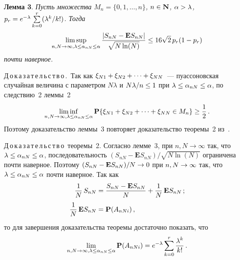 \begin{multicols}{2}
\medskip

\noindent
\textbf{Лемма 3}. \textit{Пусть множества $M_n=\{0, 1,\dots, n\}$,
$n\hm\in\mathbf{N}$, $\alpha \hm >\lambda $,
$p_r\hm=e^{-\lambda}\sum\limits_{k=0}^r({\lambda^k}/{k!}) $.  Тогда
$$
\limsup\limits_{n, N\to\infty,
\lambda\le\alpha_{nN}\le\alpha}\displaystyle\frac{\displaystyle |S_{nN}-
\mathbf{E}S_{nN}|\mathstrut}{\displaystyle \sqrt{N\ln(N)}\mathstrut}\le 16\sqrt{2}\,p_r(1-p_r)
$$
почти наверное.}

\medskip

\noindent
Д\,о\,к\,а\,з\,а\,т\,е\,л\,ь\,с\,т\,в\,о\,.\ Так как $\xi_{N1}\hm+\xi_{N2}\hm+ \dots +\xi_{NN}$~--- 
пуассоновская случайная величина с параметром $N\lambda$  и
${N\lambda}/{n}\hm\le 1 $ при $\lambda\hm\le\alpha_{nN}\hm\le\alpha$, по
следствию~2 леммы~2
$$
\liminf_{n, N\to\infty,
\lambda\le\alpha_{nN}\le\alpha} \mathbf{P}\{
 \xi_{N1}+\xi_{N2}+ \dots +\xi_{NN}\in M_n\}\ge\displaystyle\frac{\displaystyle 1\mathstrut}{\displaystyle 2\mathstrut}\,.
$$
Поэтому доказательство леммы~3 повторяет доказательство теоремы~2 из~\cite{6-chu}.

\medskip

\noindent
Д\,о\,к\,а\,з\,а\,т\,е\,л\,ь\,с\,т\,в\,о\ теоремы~2. Согласно лемме~3, 
при $n, N\to\infty$ так, что
$\lambda\hm\le\alpha_{nN}\hm\le \alpha$,
 последовательность $({S_{nN}-\mathbf{E}S_{nN}})/{\sqrt{N\ln(N)}}$
ограничена почти наверное. Поэтому $({S_{nN}-\mathbf{E}S_{nN}})/N\hm\to 0$ 
при $n, N\hm\to\infty$ так, что
$\lambda\hm\le\alpha_{nN}\hm\le\alpha$ почти наверное. Так как
\begin{align*}
\displaystyle\frac{\displaystyle 1\mathstrut}{\displaystyle N\mathstrut}\,S_{nN}&=\displaystyle\frac{\displaystyle S_{nN}-\mathbf{E}S_{nN}\mathstrut}{\displaystyle N\mathstrut}+\displaystyle\frac{\displaystyle 1\mathstrut}{\displaystyle N\mathstrut}\,\mathbf{E}S_{nN}\,;\\
\displaystyle\frac{\displaystyle 1\mathstrut}{\displaystyle N\mathstrut}\,\mathbf{E}S_{nN}&=\mathbf{P}(A_{nNi})\,,
\end{align*}
 то для завершения
доказательства теоремы достаточно показать, что
\begin{equation}
\lim_{n, N\to\infty,
\lambda\le\alpha_{nN}\le\alpha}\mathbf{P}(A_{nNi})=
e^{-\lambda}\sum_{k=0}^r\displaystyle\frac{\displaystyle \lambda^k\mathstrut}{\displaystyle k!\mathstrut}\,. \label{e15-chu}
\end{equation}


\end{multicols}
